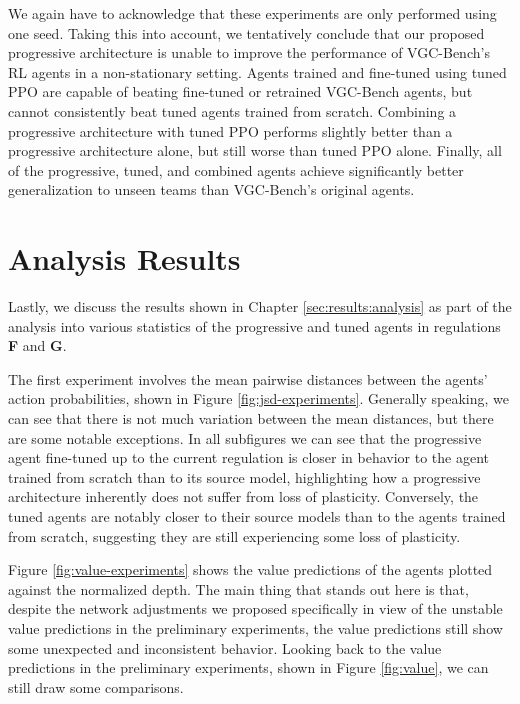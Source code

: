 We again have to acknowledge that these experiments are only performed using one seed.
Taking this into account, we tentatively conclude that our proposed progressive architecture is unable to improve the performance of VGC-Bench's RL agents in a non-stationary setting.
Agents trained and fine-tuned using tuned PPO are capable of beating fine-tuned or retrained VGC-Bench agents, but cannot consistently beat tuned agents trained from scratch.
Combining a progressive architecture with tuned PPO performs slightly better than a progressive architecture alone, but still worse than tuned PPO alone.
Finally, all of the progressive, tuned, and combined agents achieve significantly better generalization to unseen teams than VGC-Bench's original agents.

\section{Analysis Results} \label{sec:discussion:analysis}
Lastly, we discuss the results shown in Chapter \ref{sec:results:analysis} as part of the analysis into various statistics of the progressive and tuned agents in regulations \textbf{F} and \textbf{G}.

The first experiment involves the mean pairwise distances between the agents' action probabilities, shown in Figure \ref{fig:jsd-experiments}.
Generally speaking, we can see that there is not much variation between the mean distances, but there are some notable exceptions.
In all subfigures we can see that the progressive agent fine-tuned up to the current regulation is closer in behavior to the agent trained from scratch than to its source model, highlighting how a progressive architecture inherently does not suffer from loss of plasticity.
Conversely, the tuned agents are notably closer to their source models than to the agents trained from scratch, suggesting they are still experiencing some loss of plasticity.

Figure \ref{fig:value-experiments} shows the value predictions of the agents plotted against the normalized depth.
The main thing that stands out here is that, despite the network adjustments we proposed specifically in view of the unstable value predictions in the preliminary experiments, the value predictions still show some unexpected and inconsistent behavior.
Looking back to the value predictions in the preliminary experiments, shown in Figure \ref{fig:value}, we can still draw some comparisons.

